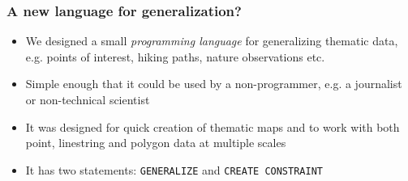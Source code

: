 \documentclass{beamer}
\begin{document}

\frame
{
  \frametitle{A new language for generalization?}
  \begin{itemize}[<+->]
  \item We designed a small \emph{programming language} for generalizing thematic data, e.g. points of interest, hiking paths, nature observations etc. 
  \item Simple enough that it could be used by a non-programmer, e.g. a journalist or non-technical scientist
  \item It was designed for quick creation of thematic maps and to work with both point, linestring and polygon data at multiple scales
  \item It has two statements: \texttt{GENERALIZE} and \texttt{CREATE CONSTRAINT}
  \end{itemize}
}
\end{document}
